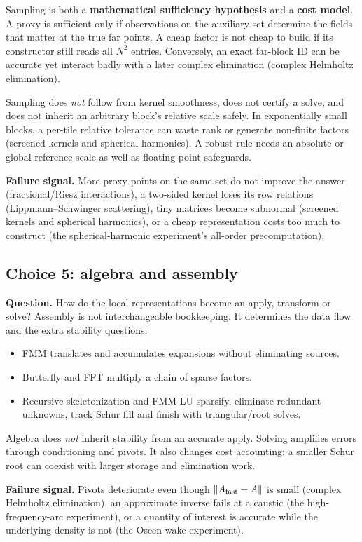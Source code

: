 Sampling is both a \textbf{mathematical sufficiency hypothesis} and a \textbf{cost model}. A proxy is sufficient only if observations on the auxiliary set determine the fields that matter at the true far points. A cheap factor is not cheap to build if its constructor still reads all $N^2$ entries. Conversely, an exact far-block ID can be accurate yet interact badly with a later complex elimination (complex Helmholtz elimination).

Sampling does \emph{not} follow from kernel smoothness, does not certify a solve, and does not inherit an arbitrary block's relative scale safely. In exponentially small blocks, a per-tile relative tolerance can waste rank or generate non-finite factors (screened kernels and spherical harmonics). A robust rule needs an absolute or global reference scale as well as floating-point safeguards.

\textbf{Failure signal.} More proxy points on the same set do not improve the answer (fractional/Riesz interactions), a two-sided kernel loses its row relations (Lippmann--Schwinger scattering), tiny matrices become subnormal (screened kernels and spherical harmonics), or a cheap representation costs too much to construct (the spherical-harmonic experiment's all-order precomputation).

\subsection{Choice 5: algebra and assembly}
\textbf{Question.} How do the local representations become an apply, transform or solve? Assembly is not interchangeable bookkeeping. It determines the data flow and the extra stability questions:
\begin{itemize}
 \item FMM translates and accumulates expansions without eliminating sources.
 \item Butterfly and FFT multiply a chain of sparse factors.
 \item Recursive skeletonization and FMM-LU sparsify, eliminate redundant unknowns, track Schur fill and finish with triangular/root solves.
\end{itemize}
Algebra does \emph{not} inherit stability from an accurate apply. Solving amplifies errors through conditioning and pivots. It also changes cost accounting: a smaller Schur root can coexist with larger storage and elimination work.

\textbf{Failure signal.} Pivots deteriorate even though $\|A_{\rm fast}-A\|$ is small (complex Helmholtz elimination), an approximate inverse fails at a caustic (the high-frequency-arc experiment), or a quantity of interest is accurate while the underlying density is not (the Oseen wake experiment).

